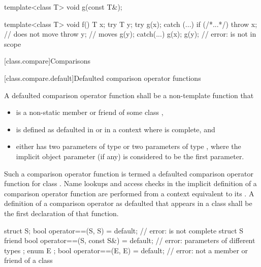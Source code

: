 \pnum
\begin{example}
\begin{codeblock}
template<class T> void g(const T&);

template<class T> void f() {
  T x;
  try {
    T y;
    try { g(x); }
    catch (...) {
      if (/*...*/)
        throw x;        // does not move
      throw y;          // moves
    }
    g(y);
  } catch(...) {
    g(x);
    g(y);               // error:  is not in scope
  }
}
\end{codeblock}
\end{example}

[class.compare]{Comparisons}%

[class.compare.default]{Defaulted comparison operator functions}%

\pnum
A defaulted comparison operator function
shall be a non-template function
that
\begin{itemize}
\item
is a non-static member or friend of some class ,

\item
is defined as defaulted in  or in
a context where  is complete, and

\item
either has
two parameters of type  or
two parameters of type ,
where the implicit object parameter (if any) is considered to be
the first parameter.
\end{itemize}
Such a comparison operator function is termed
%
a defaulted comparison operator function for class .
Name lookups and access checks in
the implicit definition
of a comparison operator function
are performed from a context equivalent to
its .
A definition of a comparison operator as
defaulted that appears in a class shall be the first declaration
of that function.
\begin{example}
\begin{codeblock}
struct S;
bool operator==(S, S) = default;                    // error:  is not complete
struct S {
  friend bool operator==(S, const S&) = default;    // error: parameters of different types
};
enum E { };
bool operator==(E, E) = default;                    // error: not a member or friend of a class
\end{codeblock}
\end{example}

